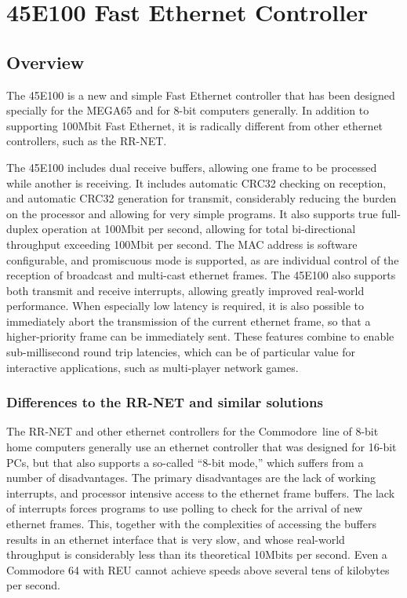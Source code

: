 \chapter{45E100 Fast Ethernet Controller}

\section{Overview}

The 45E100 is a new and simple Fast Ethernet controller that has been
designed specially for the MEGA65 and for 8-bit computers generally.
In addition to supporting 100Mbit Fast Ethernet, it is radically
different from other ethernet controllers, such as the RR-NET.

The 45E100 includes dual receive buffers, allowing one frame to be
processed while another is receiving.  It includes automatic CRC32
checking on reception, and automatic CRC32 generation for transmit, considerably
reducing the burden on the processor and allowing for very simple programs.  It also supports true
full-duplex operation at 100Mbit per second, allowing for total bi-directional
throughput exceeding 100Mbit per second.  The MAC address is software
configurable, and promiscuous mode is supported, as are individual control
of the reception of broadcast and multi-cast ethernet frames.  The 45E100 also
supports both transmit and receive interrupts, allowing greatly improved
real-world performance. When especially low latency is required, it is also possible
to immediately abort the transmission of the current ethernet frame, so that a
higher-priority frame can be immediately sent.
These features combine to enable sub-millisecond round trip latencies,
which can be of particular value for interactive applications, such as multi-player network
games.

\subsection{Differences to the RR-NET and similar solutions}

The RR-NET and other ethernet controllers for the Commodore\texttrademark \ line
of 8-bit home computers generally use an ethernet controller that was
designed for 16-bit PCs, but that also supports a so-called ``8-bit mode,''
which suffers from a number of disadvantages. The primary disadvantages
are the lack of working interrupts, and processor intensive access to
the ethernet frame buffers.  The lack of interrupts forces programs to
use polling to check for the arrival of new ethernet frames.  This,
together with the complexities of accessing the buffers results in an
ethernet interface that is very slow, and whose real-world throughput
is considerably less than its theoretical 10Mbits per second.  Even
a Commodore 64 with REU cannot achieve speeds above several tens of
kilobytes per second.


